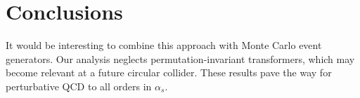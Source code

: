 \section{Conclusions}\label{sec:conclusions}

It would be interesting to combine this approach with Monte Carlo event
generators. Our analysis neglects permutation-invariant transformers,
which may become relevant at a future circular collider. These results
pave the way for perturbative QCD to all orders in $\alpha_s$.

